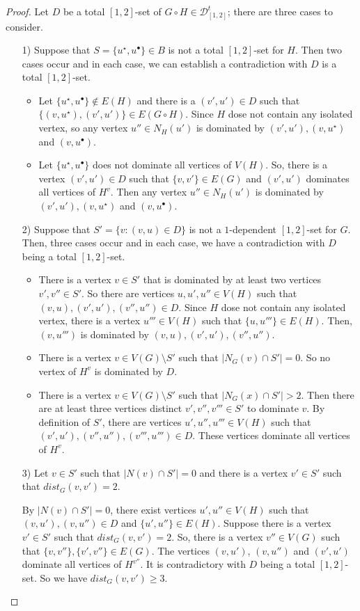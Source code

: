 \documentclass[A4,12pt]{article}
\theoremstyle{definition}
\theoremstyle{remark}
\begin{document}
\begin{proof}

Let $D$ be a total $[1,2]$-set of $G \circ H \in \mathcal{D}^t_{[1,2]}$; there are three cases to consider.
 \begin{itemize}
  \item [1)]
Suppose that $S=\{u^{\star},u^{\bullet}\} \in B$ is not a total $[1,2]$-set for $H$. Then two cases occur and in each case, we can establish  a contradiction with  $D$ is a total $[1,2]$-set.
  \begin{itemize}
  \item
  Let $\{u^{\star},u^{\bullet}\}\notin E(H)$ and there is a $(v',u')\in D$ such that $\{(v,u^{\star}),(v',u')\}\in E(G\circ H)$. Since $H$ dose not contain any isolated vertex, so any vertex $u''\in N_H(u')$ is dominated by $(v',u'),(v,u^{\star})$ and $(v, u^{\bullet})$.
  \item
  Let $\{u^{\star},u^{\bullet}\}$ does not dominate all vertices of $V(H)$. So, there is a vertex $(v',u')\in D$ such that $\{v,v'\} \in E(G)$ and  $(v',u')$  dominates all vertices of $H^v$. Then any vertex $u''\in N_H(u')$ is dominated by $(v',u'),(v,u^{\star})$ and $(v, u^{\bullet})$.
  \end{itemize}
\item [2)]
Suppose that  $S'=\{v: (v,u) \in D\}$  is not a $1$-dependent $[1,2]$-set for $G$. Then, three cases occur and in each case, we have a contradiction with  $D$ being a total $[1,2]$-set.
  \begin{itemize}
  \item
 There is a vertex  $v\in S'$ that is dominated by at least two vertices $v',v''\in S'$. So there are vertices $u,u',u''\in V(H)$ such that $(v,u),(v',u'),(v'',u'') \in D$. Since $H$ dose not contain any isolated vertex, there is a vertex $u'''\in V(H)$ such that $\{u,u'''\}\in E(H)$. Then, $(v,u''')$ is dominated by $(v,u),(v',u'),(v'',u'')$.
  \item
  There is a vertex  $v\in V(G)\setminus S'$ such that  $\vert N_G(v)\cap S'\vert=0$. So no vertex of $H^v$  is dominated by $D$.
  \item
  There is a vertex  $v\in V(G)\setminus S'$ such that $\vert N_G(x)\cap S'\vert > 2$. Then there are at least three vertices distinct $v',v'',v'''\in S'$ to dominate $v$. By definition of  $S'$,  there are vertices $u',u'',u'''\in V(H)$ such that $(v',u'),(v'',u''),(v''',u''')\in D$. These vertices dominate all vertices of $H^v$.
  \end{itemize}
 \item [3)]
 Let $v\in S'$ such that $\vert N(v)\cap S'\vert =0$ and there is a vertex  $v' \in S'$ such that  $dist_G(v,v')=2$.

By $\vert  N(v)\cap S'\vert  =0$, there exist  vertices $u',u'' \in V(H)$ such that $(v,u'), (v,u'') \in D$ and $ \{u',u''\} \in E(H)$. Suppose there is a vertex  $v' \in S'$ such that $dist_G(v,v')= 2$. So, there is  a vertex $v''\in V(G)$ such that $\{v,v''\},\{v',v''\} \in E(G)$. The vertices $(v,u')$, $(v,u'')$ and $(v',u')$ dominate all vertices of $H^{v''}$. It is contradictory with  $D$ being a total $[1,2]$-set. So we have $dist_G(v,v')\geq 3$.
 \end{itemize}

\end{proof}
\end{document}
